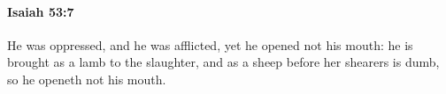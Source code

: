 
		\paragraph{Isaiah 53:7} %
			\label{ISAIAH-53-7}

			He was oppressed, and he was afflicted, yet he opened not his mouth: he is brought as a lamb to the slaughter, and as a sheep before her shearers is dumb, so he openeth not his mouth.


